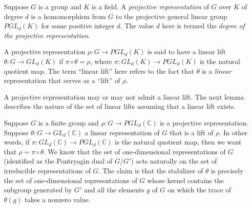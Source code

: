 \documentclass{ucetd}
\begin{document}
\begin{definer}
  Suppose $G$ is a group and $K$ is a field. A {\em projective
    representation} of $G$ over $K$ of degree $d$ is a homomorphism
  from $G$ to the projective general linear group $PGL_d(K)$ for some
  positive integer $d$. The value $d$ here is termed the {\em degree
    of the projective representation}.

  A projective representation $\rho:G \to PGL_d(K)$ is said to have a
  linear lift $\theta:G \to GL_d(K)$ if $\pi \circ \theta = \rho$,
  where $\pi: GL_d(K) \to PGL_d(K)$ is the natural quotient map. The
  term ``linear lift'' here refers to the fact that $\theta$ is a {\em
    linear} representation that serves as a ``lift'' of $\rho$.
\end{definer}

A projective representation may or may not admit a linear lift. The
next lemma describes the nature of the set of linear lifts assuming
that a linear lift exists.

\begin{lemma}\label{stabilizer-kernel-description}
  Suppose $G$ is a finite group and $\rho:G \to PGL_d(\mathbb{C})$ is
  a projective representation. Suppose $\theta:G \to GL_d(\mathbb{C})$
  a linear representation of $G$ that is a lift of $\rho$. In other
  words, if $\pi: GL_d(\mathbb{C}) \to PGL_d(\mathbb{C})$ is the
  natural quotient map, then we want that $\rho = \pi \circ
  \theta$. We know that the set of one-dimensional representations of
  $G$ (identified as the Pontryagin dual of $G/G'$) acts naturally on
  the set of irreducible representations of $G$. The claim is that the
  stabilizer of $\theta$ is precisely the set of one-dimensional
  representations of $G$ whose kernel contains the subgroup generated
  by $G'$ and all the elements $g$ of $G$ on which the trace of
  $\theta(g)$ takes a nonzero value.
\end{lemma}
\end{document}
